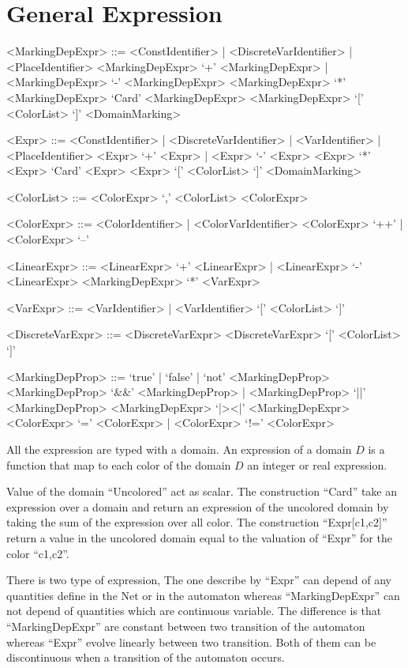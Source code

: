 \documentclass{article}
\begin{document}
\section{General Expression}

\begin{grammar}
  <MarkingDepExpr> ::= <ConstIdentifier> | <DiscreteVarIdentifier> | <PlaceIdentifier>
  \alt  <MarkingDepExpr> `+'  <MarkingDepExpr> | <MarkingDepExpr> `-'  <MarkingDepExpr>
  \alt  <MarkingDepExpr> `*'  <MarkingDepExpr>
  \alt `Card' <MarkingDepExpr>
  \alt <MarkingDepExpr> `[' <ColorList> `]'
  \alt <DomainMarking>

 <Expr> ::= <ConstIdentifier> | <DiscreteVarIdentifier>  | <VarIdentifier> | <PlaceIdentifier>
  \alt  <Expr> `+'  <Expr> | <Expr> `-'  <Expr>
  \alt  <Expr> `*'  <Expr>
  \alt `Card' <Expr>
  \alt <Expr> `[' <ColorList> `]'
  \alt <DomainMarking>

  <ColorList> ::= <ColorExpr> `,' <ColorList>
  \alt <ColorExpr>

  <ColorExpr> ::= <ColorIdentifier> | <ColorVarIdentifier>
  \alt <ColorExpr> `++' | <ColorExpr> `--'

  <LinearExpr> ::= <LinearExpr> `+'  <LinearExpr> | <LinearExpr> `-'  <LinearExpr>
  \alt <MarkingDepExpr> `*' <VarExpr>

  <VarExpr> ::= <VarIdentifier> | <VarIdentifier> `[' <ColorList> `]'

  <DiscreteVarExpr> ::= <DiscreteVarExpr> \alt <DiscreteVarExpr> `[' <ColorList> `]'

<MarkingDepProp> ::= `true' | `false' | `not' <MarkingDepProp>
  \alt <MarkingDepProp> `\&\&' <MarkingDepProp> |  <MarkingDepProp> `||' <MarkingDepProp>
  \alt <MarkingDepExpr> `|\!\!>\!<\!\!|' <MarkingDepExpr>  
  \alt <ColorExpr> `=' <ColorExpr> | <ColorExpr> `!=' <ColorExpr>

\end{grammar}

All the expression are typed with a domain. An expression of a domain
$D$ is a function that map to each color of the domain $D$ an integer
or real expression. 

Value of the domain ``Uncolored'' act as scalar.  The construction
``Card'' take an expression over a domain and return an expression of
the uncolored domain by taking the sum of the expression over all
color. The construction ``Expr[c1,c2]'' return a value in the
uncolored domain equal to the valuation of ``Expr'' for the color
``c1,c2''.


There is two type of expression, The one describe
by ``Expr'' can depend of any quantities define in the Net or in the
automaton whereas ``MarkingDepExpr'' can not depend of quantities
which are continuous variable. The difference is that
``MarkingDepExpr'' are constant between two transition of the
automaton whereas ``Expr'' evolve linearly between two
transition. Both of them can be discontinuous when a transition of the
automaton occurs.
\end{document}
